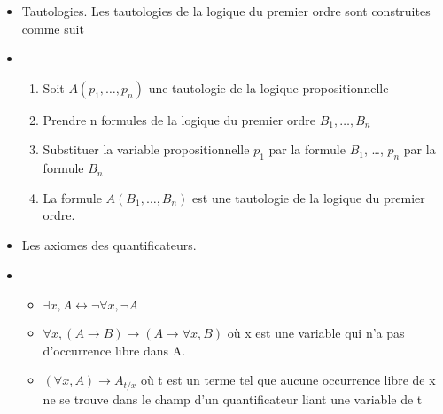 \documentclass{article}
\begin{document}
\begin{itemize}
  \item Tautologies. Les tautologies de la logique du premier ordre
        sont construites comme suit
  \item[] \begin{enumerate}
      \item
            Soit $A(p_1, \dots , p_n)$ une tautologie de la logique propositionnelle
      \item Prendre n formules de la logique du premier ordre $B_1, \dots , B_n$
      \item Substituer la variable propositionnelle $p_1$ par la formule $B_1$, \dots, $p_n$ par la formule $B_n$
      \item La formule $A(B_1, \dots , B_n)$ est une tautologie de la logique du premier ordre.
    \end{enumerate}
  \item Les axiomes des quantificateurs.
  \item[] \begin{itemize}
      \item $\exists x, A \leftrightarrow \neg \forall x, \neg A$
      \item $\forall x,(A \rightarrow B) \rightarrow (A \rightarrow \forall x, B)$ où x est une variable qui n’a pas d’occurrence libre dans A.
      \item $(\forall x, A) \rightarrow A_{t / x}$ où t est un terme tel que aucune occurrence libre de x ne se trouve dans le champ d'un quantificateur liant une variable de t
    \end{itemize}
\end{itemize}
\newpage
\end{document}
